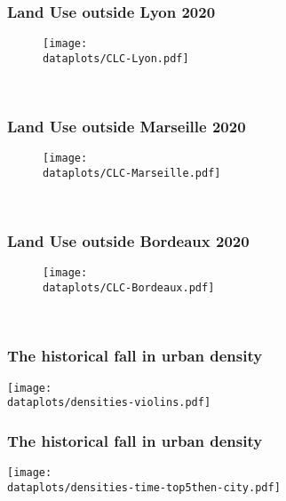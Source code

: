 \documentclass[aspectratio=169]{beamer}
\begin{document}
\begin{frame}[label=LandUseMeasureLyon]
	\frametitle{Land Use outside Lyon 2020}
	\begin{figure}
		\begin{center}
			\texttt{[image: \\dataplots/CLC-Lyon.pdf]}
		\end{center}
	\end{figure}
	\hspace{-1cm}
	\hyperlink{CLCmeasure}{}\\
\end{frame}

\begin{frame}[label=LandUseMeasureMarseille]
	\frametitle{Land Use outside Marseille 2020}
	\begin{figure}
		\begin{center}
			\texttt{[image: \\dataplots/CLC-Marseille.pdf]}
		\end{center}
	\end{figure}
	\hspace{-1cm}
	\hyperlink{CLCmeasure}{}\\
\end{frame}

\begin{frame}[label=LandUseMeasureBordeaux]
	\frametitle{Land Use outside Bordeaux 2020}
	\begin{figure}
		\begin{center}
			\texttt{[image: \\dataplots/CLC-Bordeaux.pdf]}
		\end{center}
	\end{figure}
	\hspace{-1cm}
	\hyperlink{CLCmeasure}{}\\
\end{frame}

\begin{frame}[label=violins]
\frametitle{The historical fall in urban density}
	\begin{center}
		\texttt{[image: \\dataplots/densities-violins.pdf]}
	\end{center}
\hyperlink{density}{}
\end{frame}

\begin{frame}[label=Top5]
\frametitle{The historical fall in urban density}
	\begin{center}
		\texttt{[image: \\dataplots/densities-time-top5then-city.pdf]}
	\end{center}
\hyperlink{density}{}
\end{frame}
\end{document}
